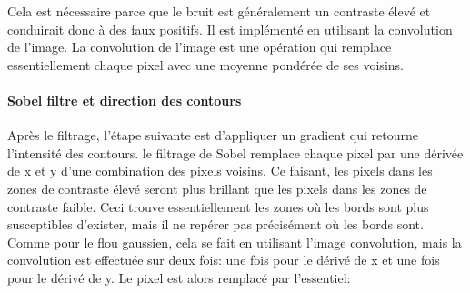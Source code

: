 

 Cela est nécessaire parce que le bruit est généralement un contraste élevé et conduirait donc à des faux positifs. Il est implémenté en utilisant la convolution de l'image. La convolution de l'image est une opération qui remplace essentiellement chaque pixel avec une moyenne pondérée de ses voisins. %












\paragraph{Sobel filtre et direction des contours}

Après le filtrage, l'étape suivante est d'appliquer un gradient qui retourne l'intensité des contours. le filtrage de Sobel remplace chaque pixel par une dérivée de x et y d'une combination des pixels voisins. Ce faisant, les pixels dans les zones de contraste élevé seront plus brillant que les pixels dans les zones de contraste faible. Ceci trouve essentiellement les zones où les bords sont plus susceptibles d'exister, mais il ne repérer pas précisément où les bords sont. Comme pour le flou gaussien, cela se fait en utilisant l'image convolution, mais la convolution est effectuée sur deux fois: une fois pour le dérivé de x et une fois pour le dérivé de y. Le pixel est alors remplacé par l'essentiel:%


